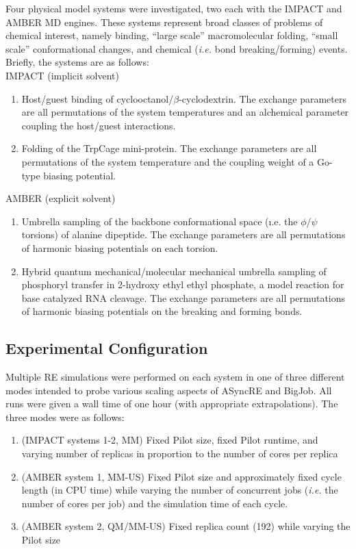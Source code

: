 \documentclass{sig-alternate}
\begin{document}
Four physical model systems were investigated, two each with the IMPACT and
AMBER MD engines. These systems represent broad classes of problems of chemical
interest, namely binding, ``large scale'' macromolecular folding, 
``small scale'' conformational changes, and chemical ({\em i.e.} bond 
breaking/forming) events. Briefly, the systems are as follows:\\
IMPACT (implicit solvent)
\begin{enumerate}
\item Host/guest binding of cyclooctanol/$\beta$-cyclodextrin. The exchange
  parameters are all permutations of the system temperatures and an
  alchemical parameter coupling the host/guest interactions.
\item Folding of the TrpCage mini-protein. The exchange parameters are all
  permutations of the system temperature and the coupling weight of a 
  Go-type biasing potential.
\end{enumerate} 
AMBER (explicit solvent)
\begin{enumerate}
\item Umbrella sampling of the backbone conformational space ({\i.e.} the 
  $\phi$/$\psi$ torsions) of alanine dipeptide. The exchange parameters are all
  permutations of harmonic biasing potentials on each torsion.
\item Hybrid quantum mechanical/molecular mechanical umbrella sampling of
  phosphoryl transfer in 2-hydroxy ethyl ethyl phosphate, a model reaction for 
  base catalyzed RNA cleavage. The exchange parameters are all permutations of 
  harmonic biasing potentials on the breaking and forming bonds.
\end{enumerate}

\subsection{Experimental Configuration}

Multiple RE simulations were performed on each system in one of three different
modes intended to probe various scaling aspects of ASyncRE and BigJob. All runs
were given a wall time of one hour (with appropriate extrapolations). The three
modes were as follows:
\begin{enumerate}[I]
\item (IMPACT systems 1-2, MM) Fixed Pilot size, fixed Pilot runtime, and varying number of replicas in proportion to the number of cores per replica
\item (AMBER system 1, MM-US) Fixed Pilot size and approximately fixed cycle
  length (in CPU time) while varying the number of concurrent jobs ({\em i.e.}
  the number of cores per job) and the simulation time of each cycle. 
\item (AMBER system 2, QM/MM-US) Fixed replica count (192) while varying the
  Pilot size %
\end{enumerate}
\end{document}

